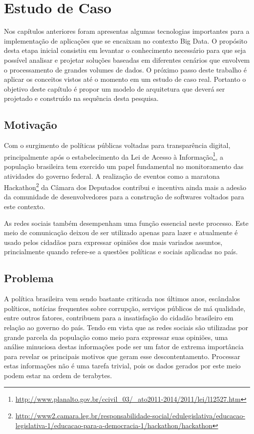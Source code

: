 \chapter{Estudo de Caso}
\label{cap:proposta}

Nos capítulos anteriores foram apresentas algumas tecnologias importantes para a implementação de aplicações que se encaixam no contexto Big Data. O propósito desta etapa inicial consistiu em levantar o conhecimento necessário para que seja possível analisar e projetar soluções baseadas em diferentes cenários que envolvem o processamento de grandes volumes de dados. O próximo passo deste trabalho é aplicar os conceitos vistos até o momento em um estudo de caso real. Portanto o objetivo deste capítulo é propor um modelo de arquitetura que deverá ser projetado e construído na sequência desta pesquisa.

\section{Motivação}

Com o surgimento de políticas públicas voltadas para transparência digital, principalmente após o estabelecimento da Lei de Acesso à Informação\footnote{\url{http://www.planalto.gov.br/ccivil_03/_ato2011-2014/2011/lei/l12527.htm}}, a população brasileira tem exercido um papel fundamental no monitoramento das atividades do governo federal. A realização de eventos como a maratona Hackathon\footnote{\url{http://www2.camara.leg.br/responsabilidade-social/edulegislativa/educacao-legislativa-1/educacao-para-a-democracia-1/hackathon/hackathon}} da Câmara dos Deputados contribui e incentiva ainda mais a adesão da comunidade de desenvolvedores para a construção de softwares voltados para este contexto.

As redes sociais também desempenham uma função essencial neste processo. Este meio de comunicação deixou de ser utilizado apenas para lazer e atualmente é usado pelos cidadãos para expressar opiniões dos mais variados assuntos, princialmente quando refere-se a questões políticas e sociais aplicadas no país.

\section{Problema}

A política brasileira vem sendo bastante criticada nos últimos anos, escândalos políticos, notícias frequentes sobre corrupção, serviços públicos de má qualidade, entre outros fatores, contribuem para a insatisfação do cidadão brasileiro em relação ao governo do país. Tendo em vista que as redes sociais são utilizadas por grande parcela da população como meio para expressar suas opiniões, uma análise minuciosa destas informações pode ser um fator de extrema importância para revelar os principais motivos que geram esse descontentamento. Processar estas informações não é uma tarefa trivial, pois os dados gerados por este meio podem estar na ordem de terabytes.

